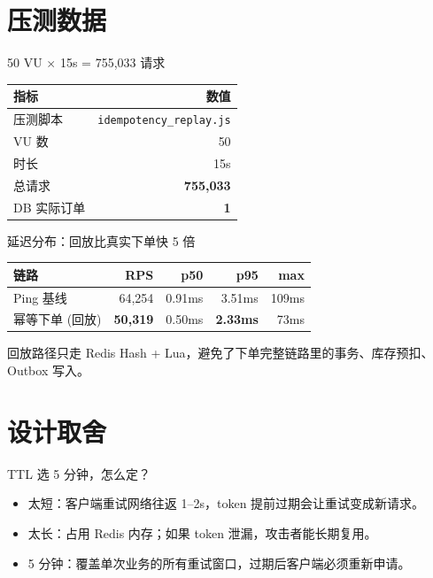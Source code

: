 \section{压测数据}

\begin{frame}{50 VU $\times$ 15s = 755{,}033 请求}
\begin{tabular}{@{}lr@{}}
\toprule
指标 & 数值 \\
\midrule
压测脚本 & \texttt{idempotency\_replay.js} \\
VU 数 & 50 \\
时长 & 15s \\
总请求 & \textbf{755{,}033} \\
DB 实际订单 & \textbf{1} \\
\bottomrule
\end{tabular}
\vspace{3mm}
\end{frame}

\begin{frame}{延迟分布：回放比真实下单快 5 倍}
\begin{tabular}{@{}lrrrr@{}}
\toprule
链路 & RPS & p50 & p95 & max \\
\midrule
Ping 基线 & 64{,}254 & 0.91ms & 3.51ms & 109ms \\
幂等下单 (回放) & \textbf{50{,}319} & 0.50ms & \textbf{2.33ms} & 73ms \\
\bottomrule
\end{tabular}
\vspace{3mm}
\small 回放路径只走 Redis Hash + Lua，避免了下单完整链路里的事务、库存预扣、Outbox 写入。
\end{frame}

\section{设计取舍}

\begin{frame}{TTL 选 5 分钟，怎么定？}
\begin{itemize}
  \item 太短：客户端重试网络往返 1--2s，token 提前过期会让重试变成新请求。
  \item 太长：占用 Redis 内存；如果 token 泄漏，攻击者能长期复用。
  \item 5 分钟：覆盖单次业务的所有重试窗口，过期后客户端必须重新申请。
\end{itemize}
\end{frame}

